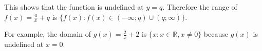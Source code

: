           
          \label{m39341*id247260}This shows that the function is undefined at \begin{math}y=q\end{math}. Therefore the range of \begin{math}f\left(x\right)=\frac{a}{x}+q\end{math} is \begin{math}\{f\left(x\right):f\left(x\right)\in \left(-\infty ;q\right)\cup \left(q;\infty \right)\}\end{math}.\par 
          \label{m39341*id247371}For example, the domain of \begin{math}g\left(x\right)=\frac{2}{x}+2\end{math} is \begin{math}\{x:x\in \mathbb{R},x\ne 0\}\end{math} because \begin{math}g\left(x\right)\end{math} is undefined at \begin{math}x=0\end{math}.\par 
          \label{m39341*id247472}\nopagebreak\noindent{}
